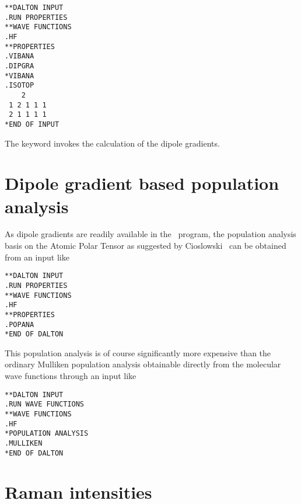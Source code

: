 \begin{verbatim}
**DALTON INPUT
.RUN PROPERTIES
**WAVE FUNCTIONS
.HF
**PROPERTIES
.VIBANA
.DIPGRA
*VIBANA
.ISOTOP
    2
 1 2 1 1 1
 2 1 1 1 1
*END OF INPUT
\end{verbatim}

\noindent The keyword  invokes the calculation of the dipole
gradients.

\section{Dipole gradient based population analysis}

\begin{center}
\end{center}

 As dipole gradients are readily available in the
\siraba\ program, the
population analysis basis on the Atomic Polar Tensor as suggested by
Cioslowski~\cite{jcjacs111,poakrkvmthjpca102} can be obtained from an input like

\begin{verbatim}
**DALTON INPUT
.RUN PROPERTIES
**WAVE FUNCTIONS
.HF
**PROPERTIES
.POPANA
*END OF DALTON
\end{verbatim}

This population analysis is of course significantly more expensive
than the ordinary Mulliken population analysis obtainable directly
from the molecular wave functions through an input like

\begin{verbatim}
**DALTON INPUT
.RUN WAVE FUNCTIONS
**WAVE FUNCTIONS
.HF
*POPULATION ANALYSIS
.MULLIKEN
*END OF DALTON
\end{verbatim}


\section{Raman intensities}\label{sec:ramanint}

